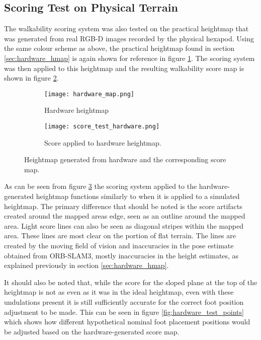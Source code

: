     \newpage
    \subsection{Scoring Test on Physical Terrain}
        The walkability scoring system was also tested on the practical heightmap that was generated from real RGB-D images recorded by the physical hexapod. Using the same colour scheme as above, the practical heightmap found in section \ref{sec:hardware_hmap} is again shown for reference in figure \ref{fig:harware_hmap}. The scoring system was then applied to this heightmap and the resulting walkability score map is shown in figure \ref{fig:hardware_score_map}.
        \begin{figure}[h]
            \centering
            \begin{subfigure}{.45\textwidth}
                \texttt{[image: hardware\_map.png]}
                \caption{Hardware heightmap}
                \label{fig:harware_hmap}
            \end{subfigure}%
            \begin{subfigure}{.45\textwidth}
                \texttt{[image: score\_test\_hardware.png]}
                \caption{Score applied to hardware heightmap.}
                \label{fig:hardware_score_map}
            \end{subfigure}
            \caption{Heightmap generated from hardware and the corresponding score map.}
            \label{fig:hardware_hmap_scoremap}
        \end{figure}

        \noindent
        As can be seen from figure \ref{fig:hardware_hmap_scoremap} the scoring system applied to the hardware-generated heightmap functions similarly to when it is applied to a simulated heightmap. The primary difference that should be noted is the score artifacts created around the mapped areas edge, seen as an outline around the mapped area. Light score lines can also be seen as diagonal stripes within the mapped area. These lines are most clear on the portion of flat terrain. The lines are created by the moving field of vision and inaccuracies in the pose estimate obtained from ORB-SLAM3, mostly inaccuracies in the height estimates, as explained previously in section \ref{sec:hardware_hmap}.

        It should also be noted that, while the score for the sloped plane at the top of the heightmap is not as even as it was in the ideal heightmap, even with these undulations present it is still sufficiently accurate for the correct foot position adjustment to be made. This can be seen in figure \ref{fig:hardware_test_points} which shows how different hypothetical nominal foot placement positions would be adjusted based on the hardware-generated score map.


